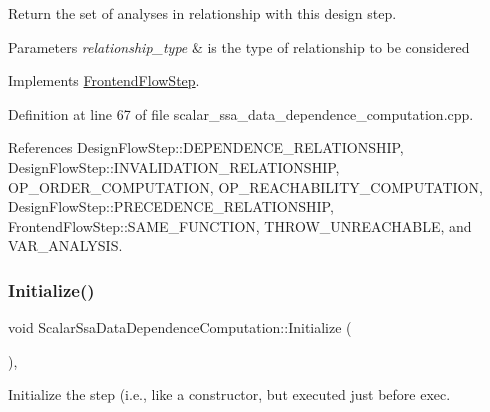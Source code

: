 Return the set of analyses in relationship with this design step. 


\begin{DoxyParams}{Parameters}
{\em relationship\+\_\+type} & is the type of relationship to be considered \\
\hline
\end{DoxyParams}


Implements \hyperlink{classFrontendFlowStep_abeaff70b59734e462d347ed343dd700d}{Frontend\+Flow\+Step}.



Definition at line 67 of file scalar\+\_\+ssa\+\_\+data\+\_\+dependence\+\_\+computation.\+cpp.



References Design\+Flow\+Step\+::\+D\+E\+P\+E\+N\+D\+E\+N\+C\+E\+\_\+\+R\+E\+L\+A\+T\+I\+O\+N\+S\+H\+IP, Design\+Flow\+Step\+::\+I\+N\+V\+A\+L\+I\+D\+A\+T\+I\+O\+N\+\_\+\+R\+E\+L\+A\+T\+I\+O\+N\+S\+H\+IP, O\+P\+\_\+\+O\+R\+D\+E\+R\+\_\+\+C\+O\+M\+P\+U\+T\+A\+T\+I\+ON, O\+P\+\_\+\+R\+E\+A\+C\+H\+A\+B\+I\+L\+I\+T\+Y\+\_\+\+C\+O\+M\+P\+U\+T\+A\+T\+I\+ON, Design\+Flow\+Step\+::\+P\+R\+E\+C\+E\+D\+E\+N\+C\+E\+\_\+\+R\+E\+L\+A\+T\+I\+O\+N\+S\+H\+IP, Frontend\+Flow\+Step\+::\+S\+A\+M\+E\+\_\+\+F\+U\+N\+C\+T\+I\+ON, T\+H\+R\+O\+W\+\_\+\+U\+N\+R\+E\+A\+C\+H\+A\+B\+LE, and V\+A\+R\+\_\+\+A\+N\+A\+L\+Y\+S\+IS.

\mbox{\label{classScalarSsaDataDependenceComputation_a16de581136910ae27dca6599125d3067}} 
\subsubsection{\texorpdfstring{Initialize()}{Initialize()}}
{\footnotesize\ttfamily void Scalar\+Ssa\+Data\+Dependence\+Computation\+::\+Initialize (\begin{DoxyParamCaption}{ }\end{DoxyParamCaption})\hspace{0.3cm}{\ttfamily [override]}, {\ttfamily [virtual]}}



Initialize the step (i.\+e., like a constructor, but executed just before exec. 




